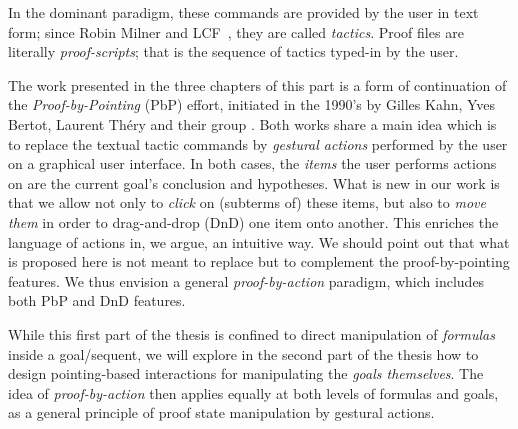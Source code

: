 In the dominant paradigm, these commands are provided by the user in
text form; since Robin Milner and
LCF~\cite{doi:10.1098/rsta.1984.0067}, they are called {\em
tactics}. Proof files are literally {\em proof-scripts}; that is the
sequence of tactics typed-in by the user.
	
	The work presented in the three chapters of this part is a form of continuation
	of the \emph{Proof-by-Pointing} (PbP) effort, initiated in the 1990's by Gilles
	Kahn, Yves Bertot, Laurent Théry and their group \cite{PbP}. Both works share a
	main idea which is to replace the textual tactic commands by {\em gestural
	actions} performed by the user on a graphical user interface. In both cases, the
	{\em items} the user performs actions on are the current goal's conclusion and
	hypotheses. What is new in our work is that we allow not only to {\em click} on
(subterms of) these items, but also to {\em move them} in order to drag-and-drop
(DnD) one item onto another. This enriches the language of actions in, we argue,
an intuitive way. We should point out that what is proposed here is not meant to
replace but to complement the proof-by-pointing features. We thus envision a
general {\em proof-by-action} paradigm, which includes both PbP and DnD
features.

While this first part of the thesis is confined to direct manipulation of
\emph{formulas} inside a goal/sequent, we will explore in the second part of the
thesis how to design pointing-based interactions for manipulating the
\emph{goals themselves}. The idea of \emph{proof-by-action} then applies equally
at both levels of formulas and goals, as a general principle of proof state
manipulation by gestural actions.




% 

% 

